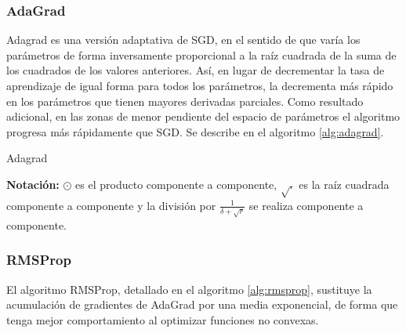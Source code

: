 \subsubsection{AdaGrad}\label{adagrad}

Adagrad \autocite{adagrad} es una versión adaptativa de SGD, en el
sentido de que varía los parámetros de forma inversamente proporcional a
la raíz cuadrada de la suma de los cuadrados de los valores anteriores.
Así, en lugar de decrementar la tasa de aprendizaje de igual forma para
todos los parámetros, la decrementa más rápido en los parámetros que
tienen mayores derivadas parciales. Como resultado adicional, en las
zonas de menor pendiente del espacio de parámetros el algoritmo progresa
más rápidamente que SGD. Se describe en el algoritmo \ref{alg:adagrad}.

\begin{algorithm}
\caption{Adagrad}
\label{alg:adagrad}
\textbf{Notación:} $\odot$ es el producto componente a componente, $\sqrt{.}$ es la raíz cuadrada componente a componente y la división por $\frac{1}{\delta + \sqrt r}$ se realiza componente a componente.
\begin{algorithmic}
  \ENDWHILE
\end{algorithmic}
\end{algorithm}

\subsubsection{RMSProp}\label{rmsprop}

El algoritmo RMSProp, detallado en el algoritmo \ref{alg:rmsprop},
sustituye la acumulación de gradientes de AdaGrad por una media
exponencial, de forma que tenga mejor comportamiento al optimizar
funciones no convexas.

